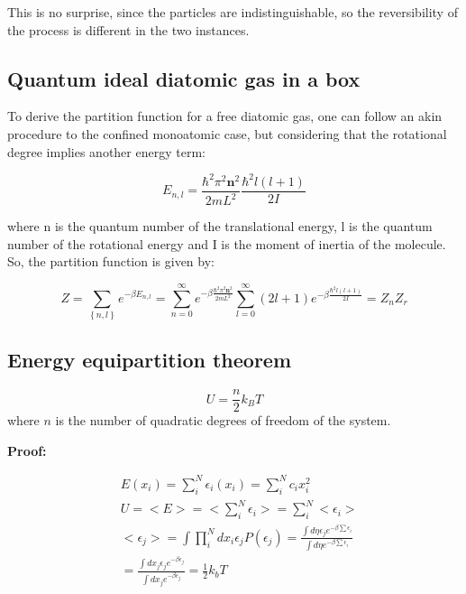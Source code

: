 \documentclass{article}
\begin{document}
This is no surprise, since the particles are indistinguishable, so the reversibility of the process is different in the two instances.

\subsection{Quantum ideal diatomic gas in a box}

To derive the partition function for a free diatomic gas, one can follow
an akin procedure to the confined monoatomic case, but considering that the rotational degree implies another energy term:

\begin{equation}
    E_{n,l}=\frac{\hbar^2\pi^2 \textbf{n}^2}{2mL^2}\frac{\hbar^2 l(l+1)}{2I}
\end{equation}

where n is the quantum number of the translational energy, l is the quantum number of the rotational energy and I is the moment of inertia of the molecule.
So, the partition function is given by:

\begin{equation}
    Z=\sum_{\left\{ n,l \right\}} e^{-\beta E_{n,l}}=\sum_{n=0}^\infty e^{-\beta\frac{\hbar^2\pi^2 \textbf{n}^2}{2mL^2}}\sum_{l=0}^{\infty}(2l+1)e^{-\beta\frac{\hbar^2 l(l+1)}{2I}}=Z_nZ_r
\end{equation}

\subsection{Energy equipartition theorem}

\begin{tcolorbox}[colframe=gray!50, colback=gray!10, coltitle=black, title=Energy Equipartition Theorem]

    \begin{equation}
        U=\frac{n}{2}k_BT
    \end{equation}
    where \( n \) is the number of quadratic degrees of freedom of the system.

\end{tcolorbox}

\textbf{Proof:}

\begin{align*}
     & E({x_i})=\sum_{i}^{N}\epsilon_i(x_i)=\sum_{i}^{N}c_ix_i^2                                                                                                 \\
     & U=<E>=<\sum_{i}^{N}\epsilon_i>=\sum_{i}^{N}<\epsilon_i>                                                                                                   \\
     & <\epsilon_j>=\int \prod_{i}^{N}dx_i\epsilon_jP(\epsilon_j)= \frac{\int d\eta \epsilon_je^{-\beta \sum \epsilon_i}}{\int d\eta e^{-\beta \sum \epsilon_i}} \\
     & = \frac{\int dx_j\epsilon_je^{-\beta \epsilon_j}}{\int dx_je^{-\beta \epsilon_j}}=\frac{1}{2}k_bT
\end{align*}
\end{document}
